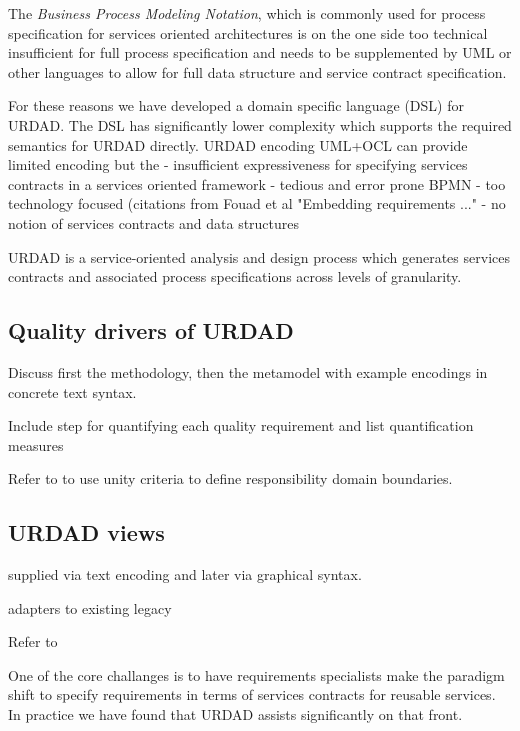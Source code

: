 The \emph{Business Process Modeling Notation}, which is commonly used for process specification for services oriented architectures is on the one side too technical \cite{} insufficient for full process specification and needs to be supplemented by UML or other languages to allow for full data structure and service contract specification.


For these reasons we have developed a domain specific language (DSL) for URDAD. The DSL has significantly lower complexity which supports the required semantics for URDAD directly. 
URDAD encoding
UML+OCL can provide limited encoding but the
  - insufficient expressiveness for specifying services contracts in a services oriented framework
  - tedious and error prone
BPMN
  - too technology focused (citations from Fouad et al "Embedding requirements ..."
  - no notion of services contracts and data structures  

URDAD is a service-oriented analysis and design process which generates services contracts and associated process specifications across levels of granularity. 

\subsection{Quality drivers of URDAD}

Discuss first the methodology, then the metamodel with example encodings in concrete text syntax.


Include step for quantifying each quality requirement and list quantification measures

Refer to \cite{gonzalez_unity_2009} to use unity criteria to define responsibility domain boundaries.




\subsection{URDAD views}

supplied via text encoding and later via graphical syntax.


adapters to existing legacy


Refer to \cite{wirfs-brock_object-oriented_1989}

One of the core challanges is to have requirements specialists make the paradigm shift to specify requirements in terms of services contracts for reusable services\cite{haines_impact_2007}. In practice we have found that URDAD assists significantly on that front.

